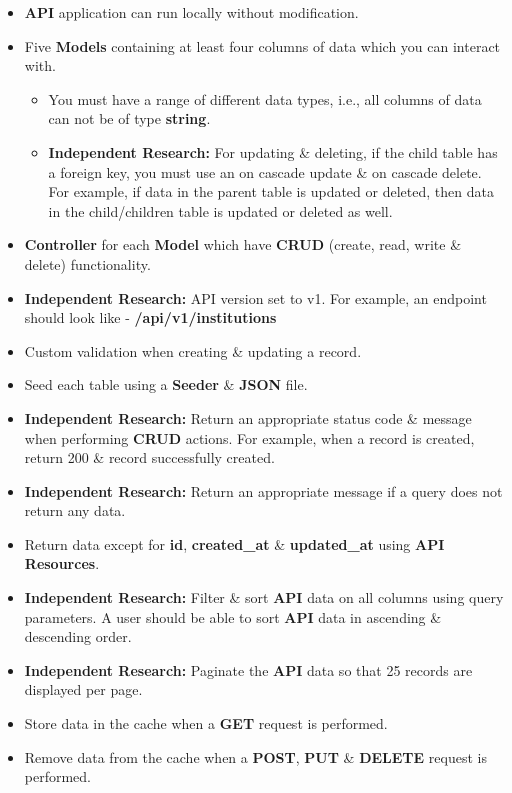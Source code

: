 \documentclass{article}
\begin{document}
\begin{itemize}
    \item \textbf{API} application can run locally without modification.
    \item Five \textbf{Models} containing at least four columns of data which you can interact with. 
    \begin{itemize}
    \item You must have a range of different data types, i.e., all columns of data can not be of type \textbf{string}.
    \item \textbf{Independent Research:} For updating \& deleting, if the child table has a foreign key, you must use an on cascade update \& on cascade delete. For example, if data in the parent table is updated or deleted, then data in the child/children table is updated or deleted as well.
  \end{itemize}
    \item \textbf{Controller} for each \textbf{Model} which have \textbf{CRUD} (create, read, write \& delete) functionality. 
    \item \textbf{Independent Research:} API version set to v1. For example, an endpoint should look like - \textbf{/api/v1/institutions}
    \item Custom validation when creating \& updating a record. 
    \item Seed each table using a \textbf{Seeder} \& \textbf{JSON} file.
    \item \textbf{Independent Research:} Return an appropriate status code \& message when performing \textbf{CRUD} actions. For example, when a record is created, return 200 \& record successfully created. 
  \item \textbf{Independent Research:} Return an appropriate message if a query does not return any data.
    \item Return data except for \textbf{id}, \textbf{created\_at} \& \textbf{updated\_at} using \textbf{API Resources}.
    \item \textbf{Independent Research:} Filter \& sort \textbf{API} data on all columns using query parameters. A user should be able to sort \textbf{API} data in ascending \& descending order.
    \item \textbf{Independent Research:} Paginate the \textbf{API} data so that 25 records are displayed per page.
    \item Store data in the cache when a \textbf{GET} request is performed. 
    \item Remove data from the cache when a \textbf{POST}, \textbf{PUT} \& \textbf{DELETE} request is performed.  

\end{itemize}
\end{document}
